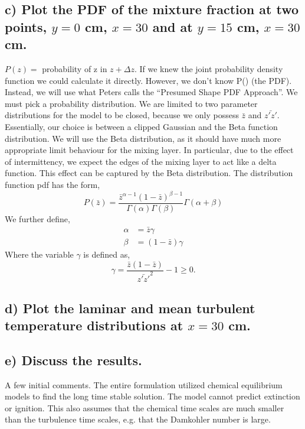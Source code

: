 \documentclass{article}
\begin{document}
\subsection*{c) Plot the PDF of the mixture fraction at two points, $y=0$ cm,
$x=30$ and at $y=15$ cm, $x=30$ cm.}

$P(z) =$ probability of z in $z+\Delta z$. If we knew the joint probability density function
we could calculate it directly. However, we don't know P() (the PDF). Instead, we will use 
what Peters calls the ``Presumed Shape PDF Approach''. We must pick a probability distribution. 
We are limited to two parameter distributions for the model to be closed, because we only possess 
$\bar z$ and $\bar{z'z'}$. Essentially, our choice is between a clipped Gaussian and the Beta 
function distribution. We will use the Beta distribution, as it should have much more appropriate 
limit behaviour for the mixing layer. In particular, due to the effect of intermittency, we expect the 
edges of the mixing layer to act like a delta function. This effect can be captured by the Beta distribution. 
The distribution function pdf has the form, 
\begin{equation}
P(\bar z) = \frac{\bar z^{\alpha-1}(1-\bar z)^{\beta-1}}{\Gamma(\alpha)\Gamma(\beta)}\Gamma(\alpha + \beta)
\end{equation}
We further define,
\begin{align}
\alpha &= \bar z \gamma \\
\beta  &= (1-\bar z) \gamma
\end{align}
Where the variable $\gamma$ is defined as, 
\begin{equation}
  \gamma = \frac{\bar z (1-\bar z)}{\bar{z'z'}^2} -1 \geq 0.
\end{equation}
%
%
%
%
\subsection*{d) Plot the laminar and mean turbulent temperature
distributions at $x=30$ cm.}

\subsection*{e) Discuss the results.}

A few initial comments. The entire formulation utilized chemical equilibrium models 
to find the long time stable solution. The model cannot predict extinction or ignition. 
This also assumes that the chemical time scales are much smaller than the turbulence 
time scales, e.g. that the Damkohler number is large. 
\end{document}
